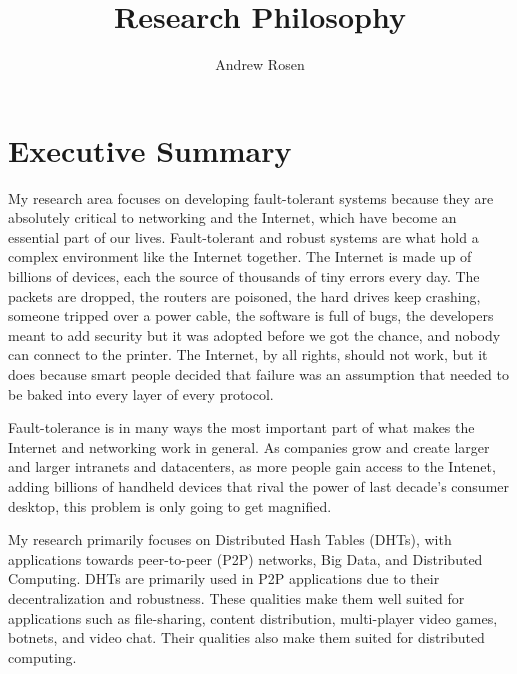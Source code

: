 \documentclass[letterpaper]{article}
\author{Andrew Rosen}
\title{Research Philosophy}
\date{}
\begin{document}
\maketitle



\section{Executive Summary}




My research area focuses on developing fault-tolerant systems because they are absolutely critical to networking and the Internet, which have become an essential part of our lives.
Fault-tolerant and robust systems are what hold a complex environment like the Internet together.
The Internet is made up of billions of devices, each the source of thousands of tiny errors every day.
The packets are dropped, the routers are poisoned, the hard drives keep crashing, someone tripped over a power cable, the software is full of bugs, the developers meant to add security but it was adopted before we got the chance, and nobody can connect to the printer.
The Internet, by all rights, should not work, but it does because smart people decided that failure was an assumption that needed to be baked into every layer of every protocol.

Fault-tolerance is in many ways the most important part of what makes the Internet and networking work in general.
As companies grow and create larger and larger intranets and datacenters, as more people gain access to the Intenet, adding billions of handheld devices that rival the power of last decade's consumer desktop, this problem is only going to get magnified.

My research primarily focuses on Distributed Hash Tables (DHTs), with applications towards peer-to-peer (P2P) networks, Big Data, and Distributed Computing.
DHTs are primarily used in P2P applications due to their decentralization and robustness. 
These qualities make them well suited for applications such as file-sharing, content distribution, multi-player video games, botnets, and video chat.
Their qualities also make them suited for distributed computing.
\end{document}
